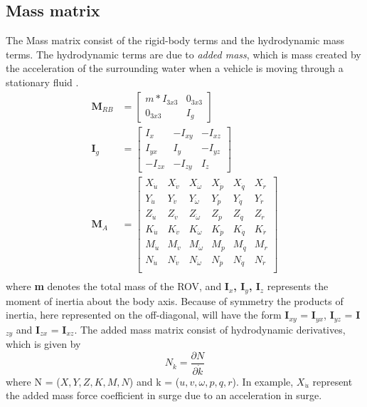 \subsection{Mass matrix}
The Mass matrix consist of the rigid-body terms and the hydrodynamic mass terms. The hydrodynamic terms are due to \textit{added mass}, which is mass created by the acceleration of the surrounding water when a vehicle is moving through a stationary fluid \cite{Fossen}. 
\begin{align}
    \textbf{M}_{RB} & = \begin{bmatrix}
                m*I_{3x3} & 0_{3x3}\\
                0_{3x3} & I_{g}
                \end{bmatrix} \\
    \mathbf{I}_{g} & = \begin{bmatrix}
                I_{x} & -I_{xy} & -I_{xz} \\
                I_{yx} & I_{y} & -I_{yz} \\
                -I_{zx} & -I_{zy} & I_{z}
                \end{bmatrix} \\
    \textbf{M}_{A} & = \begin{bmatrix}
                X_{\Dot{u}} & X_{\Dot{v}} & X_{\Dot{\omega}} & X_{\Dot{p}} & X_{\Dot{q}} & X_{\Dot{r}} \\
                Y_{\Dot{u}} & Y_{\Dot{v}} & Y_{\Dot{\omega}} & Y_{\Dot{p}} & Y_{\Dot{q}} & Y_{\Dot{r}} \\
                Z_{\Dot{u}} & Z_{\Dot{v}} & Z_{\Dot{\omega}} & Z_{\Dot{p}} & Z_{\Dot{q}} & Z_{\Dot{r}} \\
                K_{\Dot{u}} & K_{\Dot{v}} & K_{\Dot{\omega}} & K_{\Dot{p}} & K_{\Dot{q}} & K_{\Dot{r}} \\
                M_{\Dot{u}} & M_{\Dot{v}} & M_{\Dot{\omega}} & M_{\Dot{p}} & M_{\Dot{q}} & M_{\Dot{r}} \\
                N_{\Dot{u}} & N_{\Dot{v}} & N_{\Dot{\omega}} & N_{\Dot{p}} & N_{\Dot{q}} & N_{\Dot{r}} \\
                \end{bmatrix} \\
\end{align}
where \textbf{m} denotes the total mass of the ROV, and \textbf{I$_{x}$, I$_{y}$, I$_{z}$} represents the moment of inertia about the body axis. Because of symmetry the products of inertia, here represented on the off-diagonal, will have the form \textbf{I$_{xy}$} = \textbf{I$_{yx}$}, \textbf{I$_{yz}$} = \textbf{I$_{zy}$} and \textbf{I$_{zx}$} = \textbf{I$_{xz}$}. The added mass matrix consist of hydrodynamic derivatives, which is given by
\begin{equation}
N_{\Dot{k}} = \frac{\partial N}{\partial \Dot{k}}
\end{equation}
where N = ($X, Y, Z, K, M, N$) and k = ($u, v, \omega, p, q, r$). In example, $X_{\Dot{u}}$ represent the added mass force coefficient in surge due to an acceleration in surge.
